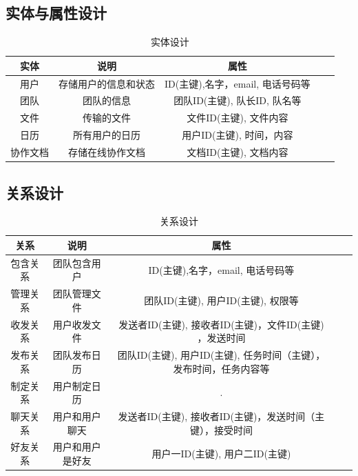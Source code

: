 \subsection{实体与属性设计}
\begin{table}[htbp]
\centering
\caption{实体设计} \label{tab:client-database}
\begin{tabular}{|c|c|c|c|c|}
    \hline
    实体 & 说明 & 属性 \\
    \hline
    用户 & 存储用户的信息和状态 & ID(主键),名字，email, 电话号码等 \\
    \hline
    团队 & 团队的信息 & 团队ID(主键), 队长ID, 队名等 \\
    \hline
    文件 & 传输的文件 & 文件ID(主键), 文件内容 \\
    \hline
    日历 & 所有用户的日历 & 用户ID(主键), 时间，内容 \\
    \hline 
    协作文档 & 存储在线协作文档 & 文档ID(主键), 文档内容 \\
    \hline
\end{tabular}
\end{table}

\subsection{关系设计}
\begin{table}[htbp]
\centering
\caption{关系设计} \label{tab:client-database}
\begin{tabular}{|c|c|c|c|c|}
    \hline
    关系 & 说明 & 属性 \\
    \hline
    包含关系 & 团队包含用户 & ID(主键),名字，email, 电话号码等 \\
    \hline
    管理关系 & 团队管理文件 & 团队ID(主键), 用户ID(主键), 权限等 \\
    \hline 
    收发关系 & 用户收发文件 & 发送者ID(主键), 接收者ID(主键)，文件ID(主键) ，发送时间\\
    \hline
    发布关系 & 团队发布日历 & 团队ID(主键), 用户ID(主键), 任务时间（主键），发布时间，任务内容等 \\
    \hline
    制定关系 & 用户制定日历 & . \\
    \hline 
    聊天关系 & 用户和用户聊天 & 发送者ID(主键), 接收者ID(主键)，发送时间（主键），接受时间 \\
    \hline 
    好友关系 & 用户和用户是好友 & 用户一ID(主键), 用户二ID(主键) \\
    
    \hline
\end{tabular}
\end{table}

